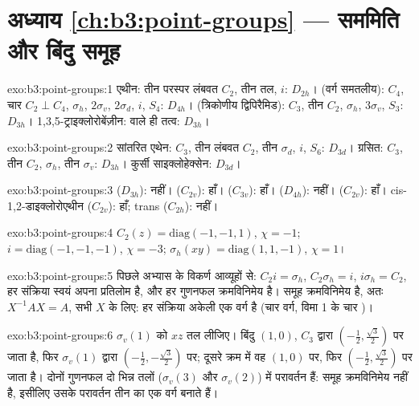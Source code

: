 \section*{अध्याय \ref{ch:b3:point-groups} --- सममिति और बिंदु समूह}

\begin{solution}{exo:b3:point-groups:1}
एथीन: तीन परस्पर लंबवत $C_2$, तीन तल, $i$: $D_{2h}$।  (वर्ग
समतलीय): $C_4$, चार $C_2 \perp C_4$, $\sigma_h$, $2\sigma_v$, $2\sigma_d$, $i$, $S_4$:
$D_{4h}$।  (त्रिकोणीय द्विपिरैमिड): $C_3$, तीन $C_2$, $\sigma_h$, $3\sigma_v$,
$S_3$: $D_{3h}$। 1,3,5-ट्राइक्लोरोबेंज़ीन:  वाले ही तत्व: $D_{3h}$।
\end{solution}

\begin{solution}{exo:b3:point-groups:2}
सांतरित एथेन: $C_3$, तीन लंबवत $C_2$, तीन $\sigma_d$, $i$, $S_6$:
$D_{3d}$। ग्रसित: $C_3$, तीन $C_2$, $\sigma_h$, तीन $\sigma_v$: $D_{3h}$।
कुर्सी साइक्लोहेक्सेन: $D_{3d}$।
\end{solution}

\begin{solution}{exo:b3:point-groups:3}
 ($D_{3h}$): नहीं।  ($C_{2v}$): हाँ।  ($C_{3v}$): हाँ।
 ($D_{4h}$): नहीं।  ($C_{2v}$): हाँ। cis-1,2-डाइक्लोरोएथीन
($C_{2v}$): हाँ; trans ($C_{2h}$): नहीं।
\end{solution}

\begin{solution}{exo:b3:point-groups:4}
$C_2(z) = \mathrm{diag}(-1,-1,1)$, $\chi = -1$; $i = \mathrm{diag}(-1,-1,-1)$,
$\chi = -3$; $\sigma_h(xy) = \mathrm{diag}(1,1,-1)$, $\chi = 1$।
\end{solution}

\begin{solution}{exo:b3:point-groups:5}
पिछले अभ्यास के विकर्ण आव्यूहों से: $C_2i = \sigma_h$, $C_2\sigma_h =
i$, $i\sigma_h = C_2$, हर संक्रिया स्वयं अपना प्रतिलोम है, और हर गुणनफल
क्रमविनिमेय है। समूह क्रमविनिमेय है, अतः $X^{-1}AX = A$, सभी $X$ के लिए: हर
संक्रिया अकेली एक वर्ग है (चार वर्ग, विमा 1 के चार )।
\end{solution}

\begin{solution}{exo:b3:point-groups:6}
$\sigma_v(1)$ को $xz$ तल लीजिए। बिंदु $(1,0)$, $C_3$ द्वारा $(-\frac12,
\frac{\sqrt3}2)$ पर जाता है, फिर $\sigma_v(1)$ द्वारा $(-\frac12,-\frac{\sqrt3}2)$ पर; दूसरे
क्रम में वह $(1,0)$ पर, फिर $(-\frac12,\frac{\sqrt3}2)$ पर जाता है। दोनों गुणनफल
दो भिन्न तलों ($\sigma_v(3)$ और $\sigma_v(2)$) में परावर्तन हैं: समूह
क्रमविनिमेय नहीं है, इसीलिए उसके परावर्तन तीन का एक वर्ग बनाते हैं।
\end{solution}

